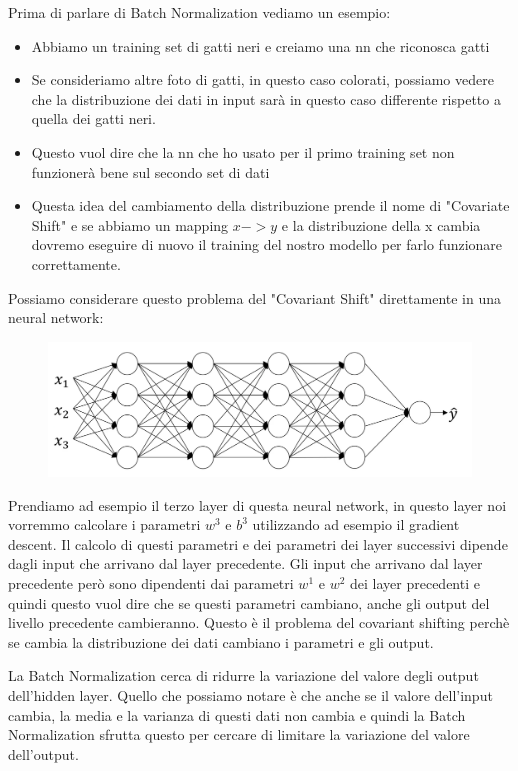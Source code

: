 \documentclass[14pt]{extreport}
\begin{document}
Prima di parlare di Batch Normalization vediamo un esempio:
\begin{itemize}
\item Abbiamo un training set di gatti neri e creiamo una nn che riconosca gatti
\item Se consideriamo altre foto di gatti, in questo caso colorati, possiamo vedere che la distribuzione
dei dati in input sarà in questo caso differente rispetto a quella dei gatti neri.
\item Questo vuol dire che la nn che ho usato per il primo training set non funzionerà bene sul secondo set di dati
\item Questa idea del cambiamento della distribuzione prende il nome di "Covariate Shift" e se abbiamo 
un mapping $x->y$ e la distribuzione della x cambia dovremo eseguire di nuovo il training del nostro modello per 
farlo funzionare correttamente.
\end{itemize}

Possiamo considerare questo problema del "Covariant Shift" direttamente in una neural network:

\begin{figure}[H]
\centering
\includegraphics[width=0.7\linewidth]{429.jpeg}
\end{figure}

Prendiamo ad esempio il terzo layer di questa neural network, in questo layer noi vorremmo calcolare i parametri
$w^3$ e $b^3$ utilizzando ad esempio il gradient descent. Il calcolo di questi parametri e dei parametri dei 
layer successivi dipende dagli input che arrivano dal layer precedente. 
Gli input che arrivano dal layer precedente però sono dipendenti dai parametri $w^1$ e $w^2$ dei layer 
precedenti e quindi questo vuol dire che se questi parametri cambiano, anche gli output del livello precedente cambieranno.
Questo è il problema del covariant shifting perchè se cambia la distribuzione dei dati cambiano i parametri e gli output.

La Batch Normalization cerca di ridurre la variazione del valore degli output dell'hidden layer.
Quello che possiamo notare è che anche se il valore dell'input cambia, la media e la varianza di questi dati non cambia 
e quindi la Batch Normalization sfrutta questo per cercare di limitare la variazione del valore dell'output.
\end{document}
